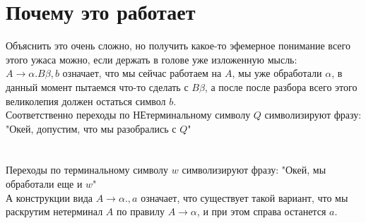 \documentclass[14pt]{extreport}
\begin{document}
	\section{Почему это работает}
	Объяснить это очень сложно, но получить какое-то эфемерное понимание всего этого ужаса можно,
	если держать в голове уже изложенную мысль:\\
	$A \to \alpha . B \beta , b$ означает, что мы сейчас работаем на $A$, мы уже обработали
	$\alpha$, в данный момент пытаемся что-то сделать с $B \beta$, а после после разбора всего
	этого великолепия должен остаться символ $b$.\\
	Соответственно переходы по НЕтерминальному символу $Q$ символизируют фразу:
	"Окей, допустим, что мы разобрались с $Q$"\\\\\\
	Переходы по терминальному символу $w$ символизируют фразу: "Окей, мы обработали еще и $w$"\\
	А конструкции вида $A \to \alpha ., a$ означает, что существует такой вариант, что
	мы раскрутим нетерминал $A$ по правилу $A \to \alpha$, и при этом справа останется $a$.\\\\
\end{document}
